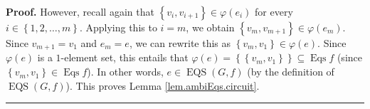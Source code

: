 \documentclass[numbers=enddot,12pt,final,onecolumn,notitlepage]{scrartcl}%
\theoremstyle{definition}
\newenvironment{proof}[1][Proof]{\noindent\textbf{#1.} }{\ \rule{0.5em}{0.5em}}
\newenvironment{vershort}{}{}
\begin{document}
\begin{vershort}
\begin{proof}
However, recall again that $\left\{  v_{i},v_{i+1}\right\}  \in\varphi\left(
e_{i}\right)  $ for every $i\in\left\{  1,2,\ldots,m\right\}  $. Applying this
to $i=m$, we obtain $\left\{  v_{m},v_{m+1}\right\}  \in\varphi\left(
e_{m}\right)  $. Since $v_{m+1}=v_{1}$ and $e_{m}=e$, we can rewrite this as
$\left\{  v_{m},v_{1}\right\}  \in\varphi\left(  e\right)  $. Since
$\varphi\left(  e\right)  $ is a $1$-element set, this entails that
$\varphi\left(  e\right)  =\left\{  \left\{  v_{m},v_{1}\right\}  \right\}
\subseteq\operatorname*{Eqs}f$ (since $\left\{  v_{m},v_{1}\right\}
\in\operatorname*{Eqs}f$). In other words, $e\in\operatorname*{EQS}\left(
G,f\right)  $ (by the definition of $\operatorname*{EQS}\left(  G,f\right)
$). This proves Lemma \ref{lem.ambiEqs.circuit}.
\end{proof}
\end{vershort}
\end{document}
